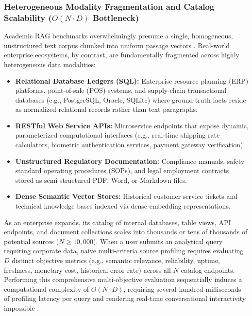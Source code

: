 \subsubsection{Heterogeneous Modality Fragmentation and Catalog Scalability ($O(N \cdot D)$ Bottleneck)}
Academic RAG benchmarks overwhelmingly presume a single, homogeneous, unstructured text corpus chunked into uniform passage vectors \cite{thakur2021beir}. Real-world enterprise ecosystems, by contrast, are fundamentally fragmented across highly heterogeneous data modalities:
\begin{itemize}
    \item \textbf{Relational Database Ledgers (SQL):} Enterprise resource planning (ERP) platforms, point-of-sale (POS) systems, and supply-chain transactional databases (e.g., PostgreSQL, Oracle, SQLite) where ground-truth facts reside as normalized relational records rather than text paragraphs.
    \item \textbf{RESTful Web Service APIs:} Microservice endpoints that expose dynamic, parameterized computational interfaces (e.g., real-time shipping rate calculators, biometric authentication services, payment gateway verification).
    \item \textbf{Unstructured Regulatory Documentation:} Compliance manuals, safety standard operating procedures (SOPs), and legal employment contracts stored as semi-structured PDF, Word, or Markdown files.
    \item \textbf{Dense Semantic Vector Stores:} Historical customer service tickets and technical knowledge bases indexed via dense embedding representations.
\end{itemize}

As an enterprise expands, its catalog of internal databases, table views, API endpoints, and document collections scales into thousands or tens of thousands of potential sources ($N \ge 10,000$). When a user submits an analytical query requiring corporate data, naive multi-criteria source profiling requires evaluating $D$ distinct objective metrics (e.g., semantic relevance, reliability, uptime, freshness, monetary cost, historical error rate) across all $N$ catalog endpoints. Performing this comprehensive multi-objective evaluation sequentially induces a computational complexity of $O(N \cdot D)$, requiring several hundred milliseconds of profiling latency per query and rendering real-time conversational interactivity impossible \cite{qin2023toolllm,patil2023gorilla}.

